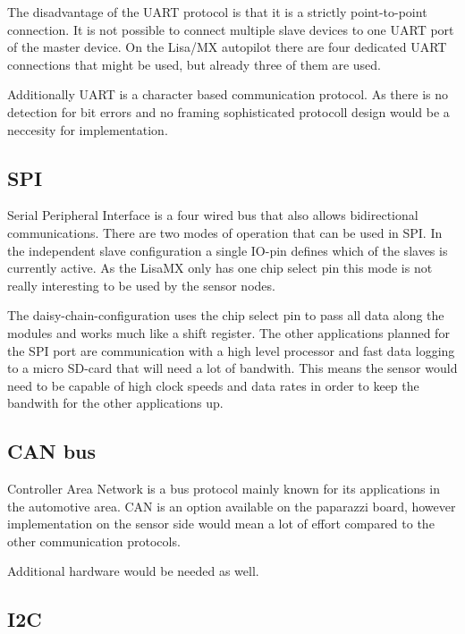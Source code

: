The disadvantage of the UART protocol is that it is a strictly point-to-point connection.
It is not possible to connect multiple slave devices to one UART port of the master device.
On the Lisa/MX autopilot there are four dedicated UART connections that might be used, but already three of them are used.

Additionally UART is a character based communication protocol.
As there is no detection for bit errors and no framing sophisticated protocoll design would be a neccesity for implementation.


\subsection{SPI}
Serial Peripheral Interface is a four wired bus that also allows bidirectional communications.
There are two modes of operation that can be used in SPI.
In the independent slave configuration a single IO-pin defines which of the slaves is currently active.
As the LisaMX only has one chip select pin this mode is not really interesting to be used by the sensor nodes.


The daisy-chain-configuration uses the chip select pin to pass all data along the modules and works much like a shift register.
The other applications planned for the SPI port are communication with a high level processor and fast data logging to a micro SD-card that will need a lot of bandwith.
This means the sensor would need to be capable of high clock speeds and data rates in order to keep the bandwith for the other applications up.


\subsection{CAN bus}
Controller Area Network is a bus protocol mainly known for its applications in the automotive area.
CAN is an option available on the paparazzi board, however implementation on the sensor side would mean a lot of effort compared to the other communication protocols.

Additional hardware would be needed as well.

\subsection{I2C}

